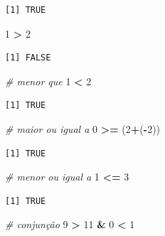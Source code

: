 \documentclass[12pt,brazil,oneside]{book}
\newenvironment{Shaded}{\begin{snugshade}}{\end{snugshade}}
\newcommand{\CommentTok}[1]{\textcolor[rgb]{0.56,0.35,0.01}{\textit{#1}}}
\newcommand{\DecValTok}[1]{\textcolor[rgb]{0.00,0.00,0.81}{#1}}
\newcommand{\NormalTok}[1]{#1}
\newcommand{\OperatorTok}[1]{\textcolor[rgb]{0.81,0.36,0.00}{\textbf{#1}}}
\newcommand{\StringTok}[1]{\textcolor[rgb]{0.31,0.60,0.02}{#1}}
\begin{document}
\begin{verbatim}
[1] TRUE
\end{verbatim}

\begin{Shaded}
\begin{Highlighting}[]
\DecValTok{1} \OperatorTok{>}\StringTok{ }\DecValTok{2}
\end{Highlighting}
\end{Shaded}

\begin{verbatim}
[1] FALSE
\end{verbatim}

\begin{Shaded}
\begin{Highlighting}[]
\CommentTok{# menor que }
\DecValTok{1} \OperatorTok{<}\StringTok{ }\DecValTok{2}
\end{Highlighting}
\end{Shaded}

\begin{verbatim}
[1] TRUE
\end{verbatim}

\begin{Shaded}
\begin{Highlighting}[]
\CommentTok{# maior ou igual a }
\DecValTok{0} \OperatorTok{>=}\StringTok{ }\NormalTok{(}\DecValTok{2}\OperatorTok{+}\NormalTok{(}\OperatorTok{-}\DecValTok{2}\NormalTok{))}
\end{Highlighting}
\end{Shaded}

\begin{verbatim}
[1] TRUE
\end{verbatim}

\begin{Shaded}
\begin{Highlighting}[]
\CommentTok{# menor ou igual a }
\DecValTok{1} \OperatorTok{<=}\StringTok{ }\DecValTok{3}
\end{Highlighting}
\end{Shaded}

\begin{verbatim}
[1] TRUE
\end{verbatim}

\begin{Shaded}
\begin{Highlighting}[]
\CommentTok{# conjunção}
\DecValTok{9} \OperatorTok{>}\StringTok{ }\DecValTok{11} \OperatorTok{&}\StringTok{ }\DecValTok{0} \OperatorTok{<}\StringTok{ }\DecValTok{1}
\end{Highlighting}
\end{Shaded}
\end{document}
